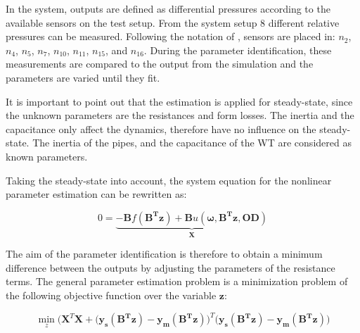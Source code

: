 In the system, outputs are defined as differential pressures according to the available sensors on the test setup. From the system setup $8$ different relative pressures can be measured. Following the notation of , sensors are placed in: 
$n_2$, $n_4$, $n_5$, $n_7$, $n_{10}$, $n_{11}$, $n_{15}$, and  $n_{16}$. During the parameter identification, these measurements are compared to the output from the simulation and the parameters are varied until they fit.

It is important to point out that the estimation is applied for steady-state, since the unknown parameters are the resistances and form losses. The inertia and the capacitance only affect the dynamics, therefore have no influence on the steady-state. The inertia of the pipes, and the capacitance of the WT are considered as known parameters. 

Taking the steady-state into account, the system equation for the nonlinear parameter estimation can be rewritten as: 

\begin{equation}
 0 = \underbrace {-\bm{B} f(\bm{B^T}\bm{z}) + \bm{B} u(\bm{\omega},\bm{B^T}\bm{z},\bm{OD}) }_{\mathcal{\bm{X}}}
 \label{InputOutputmodel_steadystate}
\end{equation}

The aim of the parameter identification is therefore to obtain a minimum difference between the outputs by adjusting the parameters of the resistance terms. The general parameter estimation problem is a minimization problem of the following objective function over the variable $\bm{z}$: 

%
%
 \begin{equation}
 \min_{z} \Big(\mathcal{\bm{X}}^T \mathcal{\bm{X}} + \big(\bm{y_{s}(B^T z)} - \bm{y_{m}(B^T z)} \big)^T  \big(\bm{ y_{s}(B^T z)} - \bm{ y_{m}(B^T z)}\big)
  \label{ObjectiveFunction11}
 \end{equation}
 
